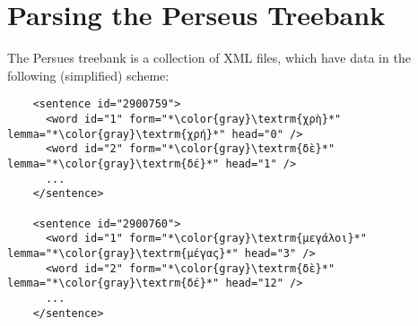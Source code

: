 \documentclass{article}
\begin{document}
\newpage
\section{Parsing the Perseus Treebank}

The Persues treebank is a collection of XML files, which have data in the
following (simplified) scheme:

\lstset{
  language=XML,
  escapeinside=**
}

\begin{lstlisting}
    <sentence id="2900759">
      <word id="1" form="*\color{gray}\textrm{χρὴ}*" lemma="*\color{gray}\textrm{χρή}*" head="0" />
      <word id="2" form="*\color{gray}\textrm{δὲ}*" lemma="*\color{gray}\textrm{δέ}*" head="1" />
      ...
    </sentence>

    <sentence id="2900760">
      <word id="1" form="*\color{gray}\textrm{μεγάλοι}*" lemma="*\color{gray}\textrm{μέγας}*" head="3" />
      <word id="2" form="*\color{gray}\textrm{δὲ}*" lemma="*\color{gray}\textrm{δέ}*" head="12" />
      ...
    </sentence>
\end{lstlisting}
\end{document}

